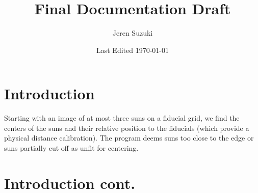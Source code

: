 \documentclass[10pt]{scrartcl}
\title{Final Documentation Draft}
\author{Jeren Suzuki}
\date{Last Edited \today}
\begin{document}
\maketitle
{}
\tableofcontents
\clearpage
{}

\section{Introduction} %
\label{sec:introduction}
Starting with an image of at most three suns on a fiducial grid, we find the centers of the suns and their relative position to the fiducials (which provide a physical distance calibration). The program deems suns too close to the edge or suns partially cut off as unfit for centering. 

\section{Introduction cont.} %
\label{sec:intro_cont}

%
%
%
%
%
\end{document}
